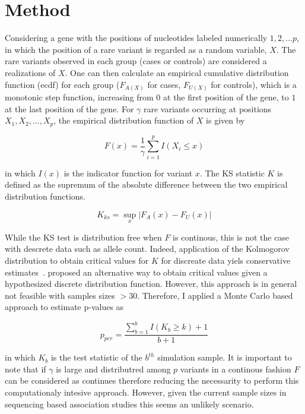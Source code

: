 \section{Method}
\label{sec:method}

Considering a gene with the positions of nucleotides labeled numerically $1, 2, \ldots p$, in which the position of a rare variant is regarded as a random variable, $X$.
The rare variants observed in each group (cases or controls) are considered a realizations of $X$.
One can then calculate an empirical cumulative distribution function (ecdf) for each group ($F_{A(X)}$ for cases, $F_{U(X)}$ for controls), which is a monotonic step function, increasing from $0$ at the first position of the gene, to $1$ at the last position of the gene.
For $\gamma$ rare variants occurring at positions $X_1, X_2, \ldots, X_p$, the empirical distribution function of $X$ is given by

\begin{equation}
  F(x) = \frac{1}{\gamma}\sum^p_{i=1}I(X_i \leq x)
\end{equation}

in which $I(x)$ is the indicator function for variant $x$.
The KS statistic $K$ is defined as the supremum of the absolute difference between the two empirical distribution functions.

\begin{equation}
	K_{ks} = \sup_x | F_A(x) - F_U(x) |
\end{equation}

While the KS test is distribution free when $F$ is continous, this is not the case with descrete data such as allele count.
Indeed, application of the Kolmogorov distribution to obtain critical values for $K$ for discreate data yiels conservative estimates~\cite{Walsh1963,Conover1972}. 
\citet{Conover1972} proposed an alternative way to obtain critical values given a hypothesized discrete distribution function.
However, this approach is in general not feasible with samples sizes $>30$.
Therefore, I applied a Monte Carlo based approach to estimate p-values as 

\begin{equation}
  p_{per} = \frac{\sum^b_{b=1} I(K_b \geq k)+1}{b+1}
\end{equation}

in which $K_b$ is the test statistic of the $b^{th}$ simulation sample.
It is important to note that if $\gamma$ is large and distributred among $p$ variants in a continous fashion $F$ can be considered as continues therefore reducing the necessarity to perform this computationaly intesive approach.
However, given the current sample sizes in sequencing based association studies this seems an unlikely scenario.

